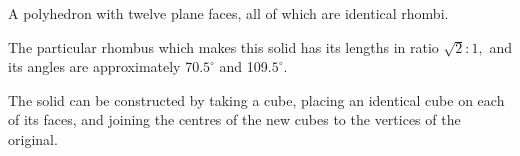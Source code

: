 A polyhedron with twelve plane faces, all of which are identical rhombi.
\par
The particular rhombus which makes this solid has its lengths in ratio
$ \sqrt{2} : 1 , $ and its angles are approximately 70.$5^{\circ}$ and 109.$5^{\circ}$. 
\par
The solid can
be constructed by taking a cube, placing an identical 
cube on each of its faces, and joining the centres
of the new cubes to the vertices of the original.